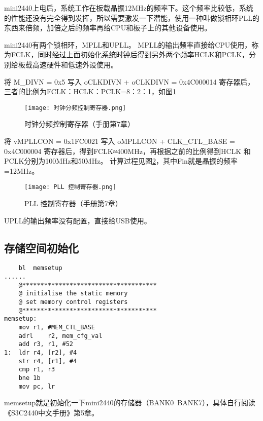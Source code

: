 mini2440上电后，系统工作在板载晶振12MHz的频率下。这个频率比较低，系统的性能还没有完全得到发挥，所以需要激发一下潜能，使用一种叫做锁相环PLL的东西来倍频，加倍之后的频率再给CPU和板子上的其他设备使用。

mini2440有两个锁相环，MPLL和UPLL。
MPLL的输出频率直接给CPU使用，称为FCLK，同时经过上面初始化系统时钟后得到另外两个频率HCLK和PCLK，分别给板载高速硬件和低速外设使用。

将 M\_DIVN = 0x5 写入 oCLKDIVN + oCLKDIVN = 0x4C000014 寄存器后，三者的比例为FCLK：HCLK：PCLK=8：2：1，如图\ref{时钟分频控制寄存器}
\begin{figure}[H]
	\texttt{[image: 时钟分频控制寄存器.png]}
	\caption{时钟分频控制寄存器（手册第7章）}
	\label{时钟分频控制寄存器}
\end{figure}

将 vMPLLCON = 0x1FC0021 写入 oMPLLCON + CLK\_CTL\_BASE = 0x4C000004 寄存器后，得到FCLK≈400MHz，再根据之前的比例得到HCLK 和 PCLK分别为100MHz和50MHz。
计算过程见图\ref{PLL 控制寄存器}，其中Fin就是晶振的频率=12MHz。
\begin{figure}[H]
	\texttt{[image: PLL 控制寄存器.png]}
	\caption{PLL 控制寄存器（手册第7章）}
	\label{PLL 控制寄存器}
\end{figure}

UPLL的输出频率没有配置，直接给USB使用。


\subsection{存储空间初始化}
\begin{lstlisting}
	bl	memsetup
......
	@*************************************
	@ initialise the static memory
	@ set memory control registers
	@*************************************
memsetup:
	mov	r1, #MEM_CTL_BASE
	adrl	r2, mem_cfg_val
	add	r3, r1, #52
1:	ldr	r4, [r2], #4
	str	r4, [r1], #4
	cmp	r1, r3
	bne	1b
	mov	pc, lr
\end{lstlisting}

memsetup就是初始化一下mini2440的存储器（BANK0~BANK7），具体自行阅读《S3C2440中文手册》第5章。

